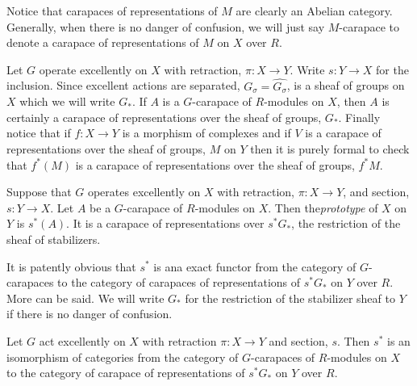 Notice that carapaces of representations of $M$ are clearly an Abelian category. Generally, when there is no danger of confusion, we will just say $M$-carapace to denote a carapace of representations of $M$ on $X$ over $R$.

Let $G$ operate excellently on $X$ with retraction, $\pi : X\rightarrow Y$. Write $s : Y \rightarrow X$ for the inclusion. Since excellent actions are separated, $G_{\sigma} = \hat{G_{\sigma}}$, is a sheaf of groups on $X$ which we will write $G_{*}$. If $A$ is a $G$-carapace of $R$-modules on $X$, then $A$ is certainly a carapace of representations over the sheaf of groups, $G_{*}$. Finally notice that if $f : X\rightarrow Y$ is a morphism of complexes and if $V$ is a carapace of representations over the sheaf of groups, $M$ on $Y$ then it is purely formal to check that $f^{*}(M)$ is a carapace of representations over the sheaf of groups, $f^{*}M$.

\begin{definition}\label{art6-definition-9.11}
Suppose that $G$ operates excellently on $X$ with retraction, $\pi : X\rightarrow Y$, and section, $s: Y \rightarrow X$. Let $A$ be a $G$-carapace of $R$-modules on $X$. Then the\textit{prototype} of $X$ on $Y$ is $s^{*}(A)$. It is a carapace of representations over $s^{*}G_{*}$, the restriction of the sheaf of stabilizers.
\end{definition}

It is patently obvious that $s^{*}$ is ana exact functor from the category of $G$-carapaces to the category of carapaces of representations of $s^{*}G_{*}$ on $Y$ over $R$. More can be said. We will write $G_{*}$ for the restriction of the stabilizer sheaf to $Y$ if there is no danger of confusion.

\begin{theorem}\label{art6-thm-9.12}
Let $G$ act excellently on $X$ with retraction $\pi : X\rightarrow Y$ and section, $s$. Then $s^{*}$ is an isomorphism of categories from the category of $G$-carapaces of $R$-modules on $X$ to the category of carapace of representations of $s^{*}G_{*}$ on $Y$ over $R$.
\end{theorem}

